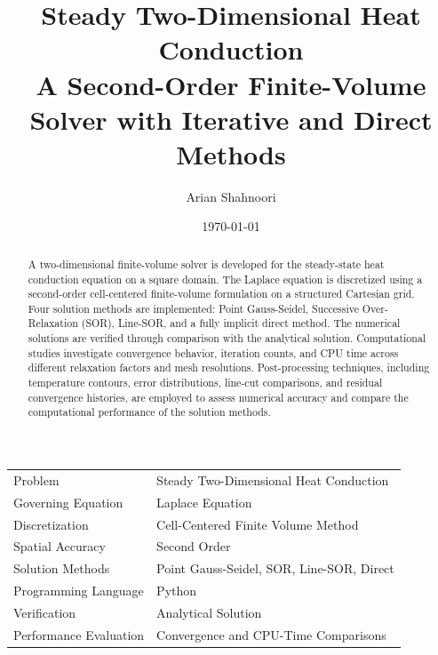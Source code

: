 \documentclass[11pt,a4paper]{article}
\title{
    \Huge\textbf{Steady Two-Dimensional Heat Conduction}\\[0.4cm]
    \Large
    A Second-Order Finite-Volume Solver with Iterative and Direct Methods
}
\author{
    \Large Arian Shahnoori
}
\date{\today}
\begin{document}

\maketitle
\thispagestyle{empty}

\vspace{0.8cm}

\begin{abstract}
A two-dimensional finite-volume solver is developed for the steady-state heat conduction equation on a square domain. The Laplace equation is discretized using a second-order cell-centered finite-volume formulation on a structured Cartesian grid. Four solution methods are implemented: Point Gauss-Seidel, Successive Over-Relaxation (SOR), Line-SOR, and a fully implicit direct method. The numerical solutions are verified through comparison with the analytical solution. Computational studies investigate convergence behavior, iteration counts, and CPU time across different relaxation factors and mesh resolutions. Post-processing techniques, including temperature contours, error distributions, line-cut comparisons, and residual convergence histories, are employed to assess numerical accuracy and compare the computational performance of the solution methods.
\end{abstract}

\vspace{0.5cm}

\begin{center}
\begin{tabular}{ll}
\toprule
Problem & Steady Two-Dimensional Heat Conduction\\
Governing Equation & Laplace Equation\\
Discretization & Cell-Centered Finite Volume Method\\
Spatial Accuracy & Second Order\\
Solution Methods & Point Gauss-Seidel, SOR, Line-SOR, Direct\\
Programming Language & Python\\
Verification & Analytical Solution\\
Performance Evaluation & Convergence and CPU-Time Comparisons\\
\bottomrule
\end{tabular}
\end{center}

\newpage

\tableofcontents

\newpage















\appendix


\end{document}
